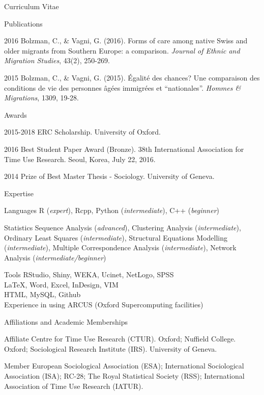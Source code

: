 \documentclass[12pt,a4paper]{article}
\newcommand*{\ac}[1]{\mbox{#1}}
\begin{document}
\begin{cv}{Curriculum Vitae}
 
 \newpage
 
   \begin{cvlist}{Publications}
   	\footnotesize   	
   	\item [2016] Bolzman, C., \& Vagni, G. (2016). Forms of care among native Swiss and older migrants from Southern Europe: a comparison. \emph{Journal of Ethnic and Migration Studies}, 43(2), 250-269.
   	
   	\item [2015]
   	Bolzman, C., \& Vagni, G. (2015). {\'E}galit{\'e} des chances? Une
   	comparaison des conditions de vie des personnes {\^a}g{\'e}es immigr{\'e}es
   	et ``nationales''. \emph{Hommes \& Migrations}, 1309, 19-28.
   \end{cvlist}
 
 
    \begin{cvlist}{Awards}
    	\item [2015-2018] ERC Scholarship. University of Oxford. 
    	\item [2016]  Best Student Paper Award (Bronze). 38th International Association for Time Use Research. Seoul, Korea, July 22, 2016. 
    	\item [2014] Prize of Best Master Thesis - Sociology.  University of Geneva. 
    \end{cvlist}

  \begin{cvlist}{\ac{Expertise}}
  \item[Languages] R (\emph{expert}), Rcpp, Python (\emph{intermediate}),  C++ (\emph{beginner}) 
  
  \item[Statistics] Sequence Analysis (\emph{advanced}), 
  Clustering Analysis (\emph{intermediate}), 
  Ordinary Least Squares (\emph{intermediate}), Structural Equations Modelling (\emph{intermediate}), Multiple Correspondence Analysis (\emph{intermediate}), 
  Network Analysis (\emph{intermediate/beginner})
  
  \item[Tools] RStudio, Shiny, \ac{WEKA}, Ucinet, NetLogo, \ac{SPSS} \\ \LaTeX, Word, Excel, InDesign, \ac{VIM} \\ 
 \ac{HTML},  MySQL,  Github \\ 
 Experience in using ARCUS (Oxford Supercomputing facilities)
  \end{cvlist}

\begin{cvlist}{Affiliations and Academic Memberships}
	\item[Affiliate] Centre for Time Use Research (CTUR). Oxford; Nuffield College. Oxford; Sociological Research Institute (IRS). University of Geneva. 
	\item[Member] European Sociological Association (ESA); International Sociological Association (ISA); RC-28; The Royal Statistical Society (RSS); International Association of Time Use Research (IATUR). 
\end{cvlist}


\end{cv}
\end{document}
